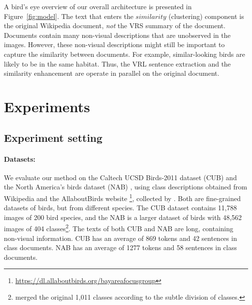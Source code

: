 \documentclass[11pt,a4paper]{article}
\newcommand\reut[1]{\textcolor{green}{\textbf{REUT:} #1 }}
\begin{document}
A bird's eye 
overview of our overall architecture is presented in Figure~\ref{fig:model}.
The text that enters the $similarity$ (clustering) component is the original Wikipedia document, {\em not} the VRS summary of the document. Documents contain many non-visual descriptions that are unobserved in the images. However, these non-visual descriptions might still be important to capture the similarity between documents. For example, similar-looking birds are likely to be in the same habitat. Thus, the VRL sentence extraction and the similarity enhancement are operate in parallel on the original document. 
\section{Experiments}

\subsection{Experiment setting}

\paragraph{Datasets:} We evaluate our method on the Caltech UCSD Birds-2011 dataset (CUB) \citet{wah2011caltech} and the North America’s birds dataset (NAB) \cite{van2015building}, using class descriptions obtained from Wikipedia and the AllaboutBirds website \footnote{\url{https://dl.allaboutbirds.org/bayareafocusgroup}}, collected by \citet{elhoseiny2017link}. 
Both are fine-grained datasets of birds, but from different species. %
The CUB dataset contains 11,788 images of 200 bird species, and the NAB
is a larger dataset of birds with 48,562 images of 404 classes\footnote{\citet{elhoseiny2017link} merged the original 1,011 classes according to the subtle division of classes.}.
The texts of both CUB and NAB are long, containing non-visual information. CUB has an average of 869 tokens and 42 sentences in class documents. NAB has an average of 1277 tokens and 58 sentences in class documents. 
\end{document}
